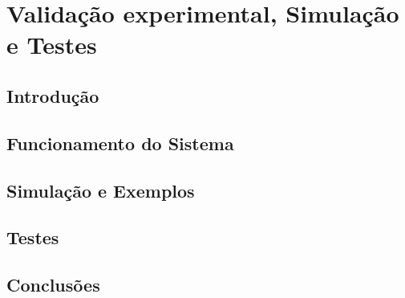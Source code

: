 \chapter{Validação experimental, Simulação e Testes}

\section{Introdução}
\label{chap5:sec:intro}

\section{Funcionamento do Sistema}
\section{Simulação e Exemplos}
\section{Testes}


\section{Conclusões}
